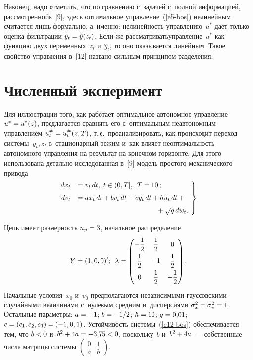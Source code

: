 \begin{multicols}{2}
     Наконец, надо отметить, что по сравнению с~задачей с~полной 
информацией, рассмотренной\linebreak в~[9], здесь оптимальное  
управ\-ле\-ние~(\ref{e5-bos}) нелинейным считается лишь формально, 
а~именно: нелинейность управлению~$u^*$ дает только оценка фильтрации 
$\hat{y}_t\hm= \hat{y}(z_t)$. Если же рассматривать\linebreak \mbox{управление}~$u^*$ как 
функцию двух переменных~$z_t$ и~$\hat{y}_t$, то оно оказывается 
линейным. Такое свойство управ\-ле\-ния в~[12] названо сильным принципом 
разделения.
     
\section{Численный эксперимент}

     Для иллюстрации того, как работает оптимальное автономное 
управление $u^*\hm= u^*(z)$, предлагается сравнить его с~оптимальным 
неавтономным управлением $u_t^\# \hm= u_t^\# (z,T)$, т.\,е.\ 
проанализировать, как происходит переход системы~$y_t, z_t$ 
в~стационарный режим и~как влияет неоптимальность автономного 
управления на результат на конечном горизонте. Для этого использована 
детально исследованная в~[9] модель простого механического привода
     \begin{equation}
     \left.
\begin{array}{rl}
     \hspace*{-2mm}dx_t&=v_t\,dt,\ t\in (0,T],\enskip T=10\,;\\[6pt]
     \hspace*{-2mm}dv_t&=ax_t\,dt +bv_t\,dt +cy_t\,dt+h u_t\,dt +{}\\[6pt]
     &\hspace*{40mm}{}+\sqrt{g}\,dw_t.
     \end{array}
     \!\right\}
     \label{e12-bos}
     \end{equation}
     
     Цепь имеет размерность $n_y\hm=3$, начальное распределение 
     $$
     Y= (1,0,0)^\prime;\enskip
     \lambda = \begin{pmatrix}
     -\displaystyle\frac{\displaystyle 1\mathstrut}{\displaystyle 2\mathstrut} & \displaystyle\frac{\displaystyle 1\mathstrut}{\displaystyle 2\mathstrut} &0\\
     \displaystyle\frac{\displaystyle 1\mathstrut}{\displaystyle 2\mathstrut} & -1 & \displaystyle\frac{\displaystyle 1\mathstrut}{\displaystyle 2\mathstrut}\\
     0 & \displaystyle\frac{\displaystyle 1\mathstrut}{\displaystyle 2\mathstrut} & -\displaystyle\frac{\displaystyle 1\mathstrut}{\displaystyle 2\mathstrut}
     \end{pmatrix}.
     $$
      Начальные условия~$x_0$ и~$v_0$ предполагаются 
независимыми гауссовскими случайными величинами с~нулевым средним 
и~дисперсиями $\sigma_x^2\hm=\sigma_v^2\hm=1$. Остальные параметры: 
$a\hm= -1$; $b\hm= -1/2$; $h\hm=10$; $g\hm= 0{,}01$; $c\hm= (c_1, c_2, 
c_3) \hm= (-1,0,1)$. Устойчивость системы~(\ref{e12-bos}) обеспечивается 
тем, что $b\hm<0$ и~$b^2\hm+4a\hm= -3{,}75\hm<0$, поскольку~$b$ 
и~$b^2\hm+4a$~--- собственные числа матрицы системы $\begin{pmatrix}
     0& 1\\
     a &b\end{pmatrix}$.
     

\end{multicols}
